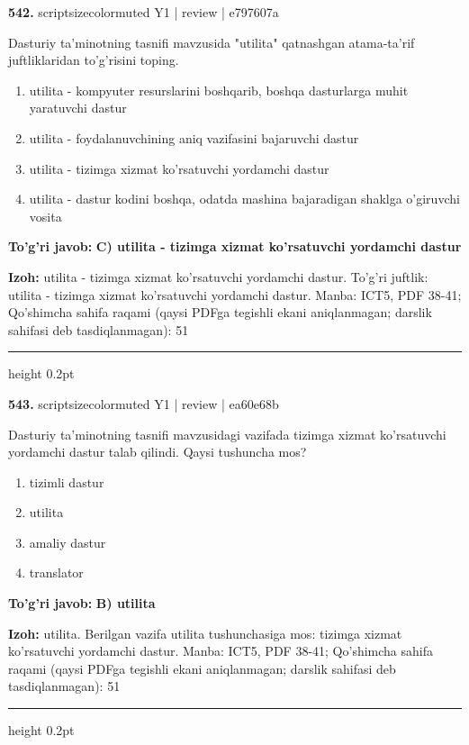 \documentclass[10pt,a4paper]{article}
\begin{document}
{\bfseries\sffamily\color{ink} 542.} {scriptsizecolor{muted} Y1 | review | e797607a}
\par
Dasturiy ta'minotning tasnifi mavzusida "utilita" qatnashgan atama-ta'rif juftliklaridan to'g'risini toping.
\begin{enumerate}[label=\Alph*),leftmargin=9mm]
\item utilita - kompyuter resurslarini boshqarib, boshqa dasturlarga muhit yaratuvchi dastur
\item utilita - foydalanuvchining aniq vazifasini bajaruvchi dastur
\item utilita - tizimga xizmat ko'rsatuvchi yordamchi dastur
\item utilita - dastur kodini boshqa, odatda mashina bajaradigan shaklga o'giruvchi vosita
\end{enumerate}
\begin{tcolorbox}[enhanced,breakable,colback=teal!4,colframe=teal!60!black,boxrule=0.45pt,arc=1.2mm,left=2.7mm,right=2.7mm,top=1.8mm,bottom=1.8mm,before skip=2mm,after skip=2mm]
{\bfseries\sffamily\color{teal}To'g'ri javob:} \textbf{C) utilita - tizimga xizmat ko'rsatuvchi yordamchi dastur}
\par\smallskip
{\bfseries Izoh:} utilita - tizimga xizmat ko'rsatuvchi yordamchi dastur. To'g'ri juftlik: utilita - tizimga xizmat ko'rsatuvchi yordamchi dastur. Manba: ICT5, PDF 38-41; Qo'shimcha sahifa raqami (qaysi PDFga tegishli ekani aniqlanmagan; darslik sahifasi deb tasdiqlanmagan): 51
\end{tcolorbox}
\vspace{2mm}\hrule height 0.2pt\vspace{3mm}

{\bfseries\sffamily\color{ink} 543.} {scriptsizecolor{muted} Y1 | review | ea60e68b}
\par
Dasturiy ta'minotning tasnifi mavzusidagi vazifada tizimga xizmat ko'rsatuvchi yordamchi dastur talab qilindi. Qaysi tushuncha mos?
\begin{enumerate}[label=\Alph*),leftmargin=9mm]
\item tizimli dastur
\item utilita
\item amaliy dastur
\item translator
\end{enumerate}
\begin{tcolorbox}[enhanced,breakable,colback=teal!4,colframe=teal!60!black,boxrule=0.45pt,arc=1.2mm,left=2.7mm,right=2.7mm,top=1.8mm,bottom=1.8mm,before skip=2mm,after skip=2mm]
{\bfseries\sffamily\color{teal}To'g'ri javob:} \textbf{B) utilita}
\par\smallskip
{\bfseries Izoh:} utilita. Berilgan vazifa utilita tushunchasiga mos: tizimga xizmat ko'rsatuvchi yordamchi dastur. Manba: ICT5, PDF 38-41; Qo'shimcha sahifa raqami (qaysi PDFga tegishli ekani aniqlanmagan; darslik sahifasi deb tasdiqlanmagan): 51
\end{tcolorbox}
\vspace{2mm}\hrule height 0.2pt\vspace{3mm}
\end{document}
